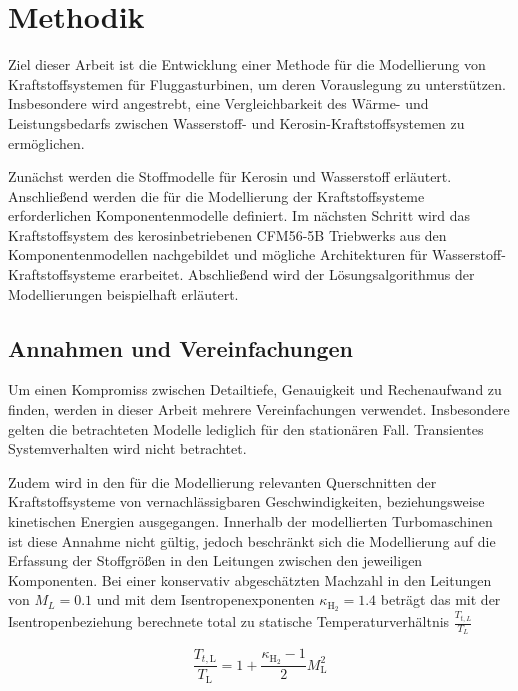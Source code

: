 \chapter{Methodik}
\label{chap:methodik}
Ziel dieser Arbeit ist die Entwicklung einer Methode für die Modellierung von Kraftstoffsystemen für Fluggasturbinen, um deren Vorauslegung zu unterstützen. Insbesondere wird angestrebt, eine Vergleichbarkeit des Wärme- und Leistungsbedarfs zwischen Wasserstoff- und Kerosin-Kraftstoffsystemen zu ermöglichen. 

Zunächst werden die Stoffmodelle für Kerosin und Wasserstoff erläutert. Anschließend werden die für die Modellierung der Kraftstoffsysteme erforderlichen Komponentenmodelle definiert. Im nächsten Schritt wird das Kraftstoffsystem des kerosinbetriebenen CFM56\nobreakdash-5B Triebwerks aus den Komponentenmodellen nachgebildet und mögliche Architekturen für Wasserstoff-Kraftstoffsysteme erarbeitet. Abschließend wird der Lösungsalgorithmus der Modellierungen beispielhaft erläutert.

\section{Annahmen und Vereinfachungen}

Um einen Kompromiss zwischen Detailtiefe, Genauigkeit und Rechenaufwand zu finden, werden in dieser Arbeit mehrere Vereinfachungen verwendet. Insbesondere gelten die betrachteten Modelle lediglich für den stationären Fall. Transientes Systemverhalten wird nicht betrachtet. 

Zudem wird in den für die Modellierung relevanten Querschnitten der Kraftstoffsysteme von vernachlässigbaren Geschwindigkeiten, beziehungsweise kinetischen Energien ausgegangen. Innerhalb der modellierten Turbomaschinen ist diese Annahme nicht gültig, jedoch beschränkt sich die Modellierung auf die Erfassung der Stoffgrößen in den Leitungen zwischen den jeweiligen Komponenten. Bei einer konservativ abgeschätzten Machzahl in den Leitungen von $M_L=0.1$ und mit dem Isentropenexponenten $\kappa_{\mathrm{H}_2} = 1.4$ beträgt das mit der Isentropenbeziehung berechnete total zu statische Temperaturverhältnis  $\frac{T_{t,L}}{T_L}$

\begin{equation}\label{Eq:mach}
	\frac{T_{t,\mathrm{L}}}{T_\mathrm{L}}=1+\frac{\kappa_{\mathrm{H}_2}-1}{2}M_\mathrm{L}^2
\end{equation}


